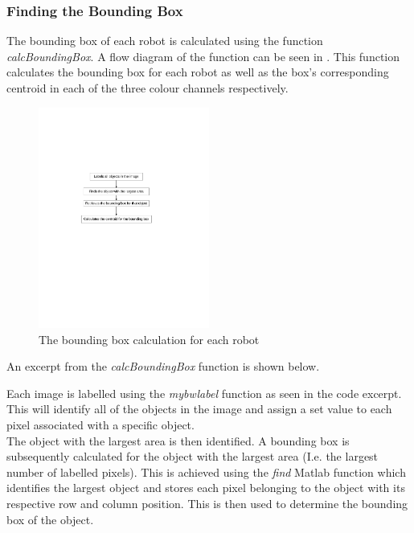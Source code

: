 \documentclass{article}
\begin{document}
\subsubsection{Finding the Bounding Box}
\label{sec:boundbox}

The bounding box of each robot is calculated using the function \textit{calcBoundingBox}. A flow diagram of the function can be seen in . This function calculates the bounding box for each robot as well as the box's corresponding centroid in each of the three colour channels respectively.

\begin{figure}[h!] 
  \centering
    \includegraphics[width=0.5\textwidth]{../Drawings/boundingbox.pdf}
    \caption{The bounding box calculation for each robot }
    \label{fig:bounding}
\end{figure}

An excerpt from the \textit{calcBoundingBox} function is shown below.



Each image is labelled using the \textit{mybwlabel} function as seen in the code excerpt. This will identify all of the objects in the image and assign a set value to each pixel associated with a specific object.  \\

The object with the largest area is then identified. A bounding box is subsequently calculated for the object with the largest area (I.e. the largest number of labelled pixels). This is achieved using the \textit{find} Matlab function which identifies the largest object and stores each pixel belonging to the object with its respective row and column position. This is then used to determine the bounding box of the object.\\
\end{document}
